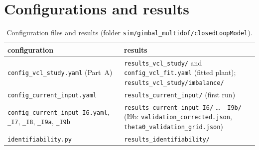 \documentclass[10pt,a4paper]{article}
\numberwithin{equation}{section}
\begin{document}
\section{Configurations and results}
\begin{table}[H]\centering\small
\caption{Configuration files and results (folder \texttt{sim/gimbal\_multidof/closedLoopModel}).}
\begin{tabularx}{\linewidth}{lY}\toprule
configuration & results \\ \midrule
\texttt{config\_vcl\_study.yaml} (Part~A) & \texttt{results\_vcl\_study/} and \texttt{config\_vcl\_fit.yaml} (fitted plant); \texttt{results\_vcl\_study/imbalance/} \\
\texttt{config\_current\_input.yaml} & \texttt{results\_current\_input/} (first run) \\
\texttt{config\_current\_input\_I6.yaml}, \texttt{\_I7}, \texttt{\_I8}, \texttt{\_I9a}, \texttt{\_I9b} & \texttt{results\_current\_input\_I6/} \dots\ \texttt{\_I9b/} (I9b: \texttt{validation\_corrected.json}, \texttt{theta0\_validation\_grid.json}) \\
\texttt{identifiability.py} & \texttt{results\_identifiability/} \\ \bottomrule
\end{tabularx}\end{table}
\end{document}
